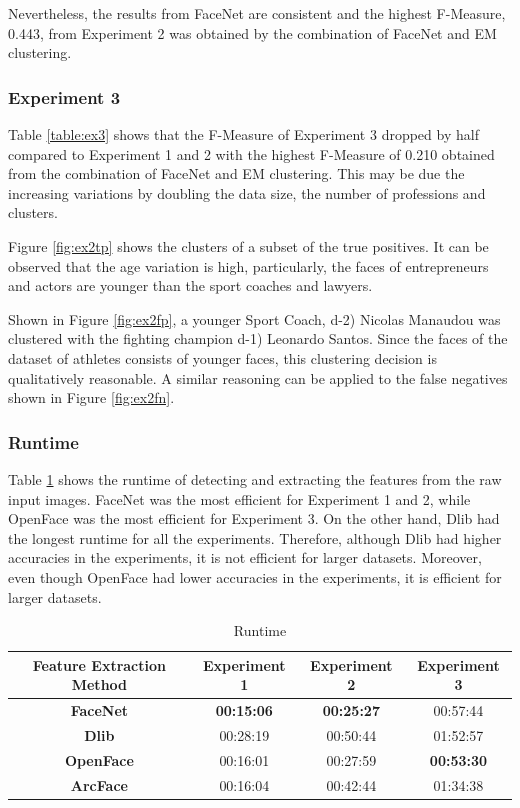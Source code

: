 \documentclass[12pt,english]{article}
\begin{document}
Nevertheless, the results from FaceNet are consistent and the highest F-Measure, 0.443, from Experiment 2 was obtained by the combination of FaceNet and EM clustering.

\subsubsection{Experiment 3}
\quad
Table \ref{table:ex3} shows that the F-Measure of Experiment 3 dropped by half compared to Experiment 1 and 2 with the highest F-Measure of 0.210 obtained from the combination of FaceNet and EM clustering. This may be due the increasing variations by doubling the data size, the number of professions and clusters.

Figure \ref{fig:ex2tp} shows the clusters of a subset of the true positives. It can be observed that the age variation is high, particularly, the faces of entrepreneurs and actors are younger than the sport coaches and lawyers. 

Shown in Figure \ref{fig:ex2fp}, a younger Sport Coach, d-2) Nicolas Manaudou  was clustered with the fighting champion d-1) Leonardo Santos. Since the faces of the dataset of athletes consists of younger faces, this clustering decision is qualitatively reasonable. A similar reasoning can be applied to the false negatives shown in Figure \ref{fig:ex2fn}.

\subsubsection{Runtime}
\quad
Table \ref{table:runtime} shows the runtime of detecting and extracting the features from the raw input images. FaceNet was the most efficient for Experiment 1 and 2, while OpenFace was the most efficient for Experiment 3. On the other hand, Dlib had the longest runtime for all the experiments. Therefore, although Dlib had higher accuracies in the experiments, it is not efficient for larger datasets. Moreover, even though OpenFace had lower accuracies in the experiments, it is efficient for larger datasets.


\begin{table}[h!]
\centering
\begin{tabular}{||c c c c||} 
 \hline
Feature Extraction Method & Experiment 1 & Experiment 2 & Experiment 3\\ [0.5ex]
 \hline\hline
 \textbf{FaceNet} & \textbf{00:15:06} & \textbf{00:25:27} & 00:57:44\\ 
 \hline
  \textbf{Dlib} & 00:28:19 & 00:50:44 & 01:52:57\\
 \hline
 \textbf{OpenFace} & 00:16:01 & 00:27:59 & \textbf{00:53:30}\\
 \hline
 \textbf{ArcFace} & 00:16:04 & 00:42:44 & 01:34:38\\
 \hline
\end{tabular}
\caption{Runtime}
\label{table:runtime}
\end{table}
\end{document}
